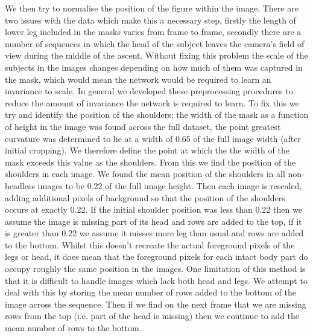 \documentclass[11pt]{article} %
\begin{document}
We then try to normalise the position of the figure within the image. There are two issues with the data which make this a necessary step, firstly the length of lower leg included in the masks varies from frame to frame, secondly there are a number of sequences in which the head of the subject leaves the camera's field of view during the middle of the ascent. Without fixing this problem the scale of the subjects in the images changes depending on how much of them was captured in the mask, which would mean the network would be required to learn an invariance to scale. In general we developed these preprocessing procedures to reduce the amount of invariance the network is required to learn. To fix this we try and identify the position of the shoulders; the width of the mask as a function of height in the image was found across the full dataset, the point greatest curvature was determined to lie at a width of 0.65 of the full image width (after initial cropping). We therefore define the point at which the the width of the mask exceeds this value as the shoulders. From this we find the position of the shoulders in each image. We found the mean position of the shoulders in all non-headless images to be 0.22 of the full image height. Then each image is rescaled, adding additional pixels of background so that the position of the shoulders occurs at exactly 0.22. If the initial shoulder position was less than 0.22 then we assume the image is missing part of its head and rows are added to the top, if it is greater than 0.22 we assume it misses more leg than usual and rows are added to the bottom. Whilst this doesn't recreate the actual foreground pixels of the legs or head, it does mean that the foreground pixels for each intact body part do occupy roughly the same position in the images. One limitation of this method is that it is difficult to handle images which lack both head and legs. We attempt to deal with this by storing the mean number of rows added to the bottom of the image across the sequence. Then if we find on the next frame that we are missing rows from the top (i.e. part of the head is missing) then we continue to add the mean number of rows to the bottom.
\end{document}
